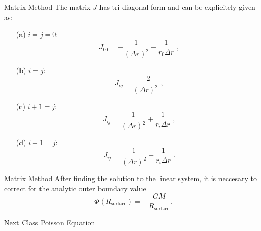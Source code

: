 \documentclass[11pt]{beamer}
\begin{document}
\begin{frame}[fragile]{Matrix Method}
The matrix $J$ has tri-diagonal form and can be explicitely given as:
\begin{itemize}
\item[(a)] $i=j=0$:
\begin{equation}
J_{00} = - \frac{1}{(\Delta r)^2} - \frac{1}{r_0 \Delta r}\,\,,
\end{equation}
\item[(b)] $i=j$:
\begin{equation}
J_{ij} = \frac{-2}{(\Delta r)^2}\,\,,
\end{equation}
\item[(c)] $i+1=j$:
\begin{equation}
J_{ij} = \frac{1}{(\Delta r)^2} + \frac{1}{r_i \Delta r}\,\,,
\end{equation}
\item[(d)] $i-1=j$:
\begin{equation}
J_{ij} = \frac{1}{(\Delta r)^2} - \frac{1}{r_i \Delta r}\,\,.
\end{equation}
\end{itemize}
\end{frame}

\begin{frame}[fragile]{Matrix Method}
After finding the solution to the linear system, it is neccesary to correct for the analytic outer boundary
value 
\begin{equation}
\Phi(R_\text{surface}) = - \frac{G M}{R_\text{surface}}.
\end{equation}
\end{frame}


\begin{frame}[fragile]{Next Class}
Poisson Equation
\end{frame}
\end{document}
